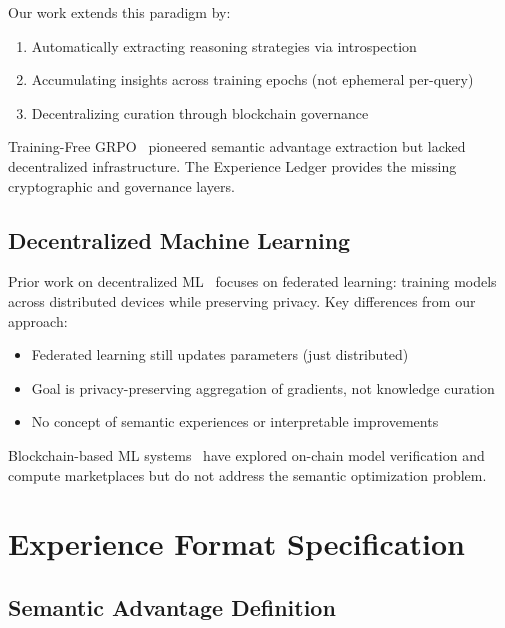 \documentclass[11pt,letterpaper]{article}
\begin{document}
Our work extends this paradigm by:
\begin{enumerate}
    \item Automatically extracting reasoning strategies via introspection
    \item Accumulating insights across training epochs (not ephemeral per-query)
    \item Decentralizing curation through blockchain governance
\end{enumerate}

Training-Free GRPO~\cite{tencentyoutu2025grpo} pioneered semantic advantage extraction but lacked decentralized infrastructure. The Experience Ledger provides the missing cryptographic and governance layers.

\subsection{Decentralized Machine Learning}

Prior work on decentralized ML~\cite{mcmahan2017communication,kairouz2021advances} focuses on federated learning: training models across distributed devices while preserving privacy. Key differences from our approach:

\begin{itemize}
    \item Federated learning still updates parameters (just distributed)
    \item Goal is privacy-preserving aggregation of gradients, not knowledge curation
    \item No concept of semantic experiences or interpretable improvements
\end{itemize}

Blockchain-based ML systems~\cite{kurtulmus2018trustless,harris2019decentralized} have explored on-chain model verification and compute marketplaces but do not address the semantic optimization problem.

\section{Experience Format Specification}
\label{sec:format}

\subsection{Semantic Advantage Definition}
\end{document}
